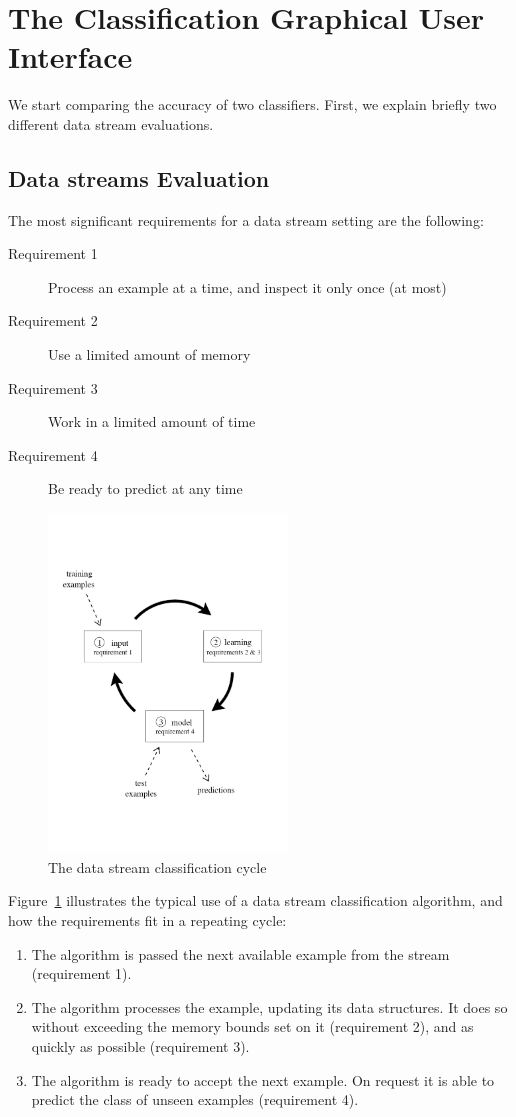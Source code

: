 \documentclass[a4paper,12pt]{article}
\begin{document}
\section{The Classification Graphical User Interface}

We start comparing the accuracy of two classifiers. First, we explain briefly two different data stream evaluations.%

\subsection{Data streams Evaluation}
The most significant requirements for a data stream setting are the following: 
\begin{description}
\item[Requirement 1] Process an example at a time, and inspect
 it only once (at most)
\item[Requirement 2] Use a limited amount of memory
\item[Requirement 3] Work in a limited amount of time
\item[Requirement 4] Be ready to predict at any time
\end{description}
\begin{figure}[t]
\begin{center} 
\includegraphics[height=9cm]{images/Frame.pdf}
\end{center} 
\caption{The data stream classification cycle}
\label{fig:cycle}
\end{figure} 

Figure~\ref{fig:cycle} illustrates the typical use of a data stream 
classification algorithm, and how the requirements fit 
in a repeating cycle:
\begin{enumerate}
\item  The algorithm is passed the next available example from the stream
   (requirement 1).
\item  The algorithm processes the example, updating its data structures. It
   does so without exceeding the memory bounds set on it (requirement 2),
   and as quickly as possible (requirement 3).
\item  The algorithm is ready to accept the next example. On request it is
   able to predict the class of unseen examples
   (requirement 4).
\end{enumerate}
\end{document}
